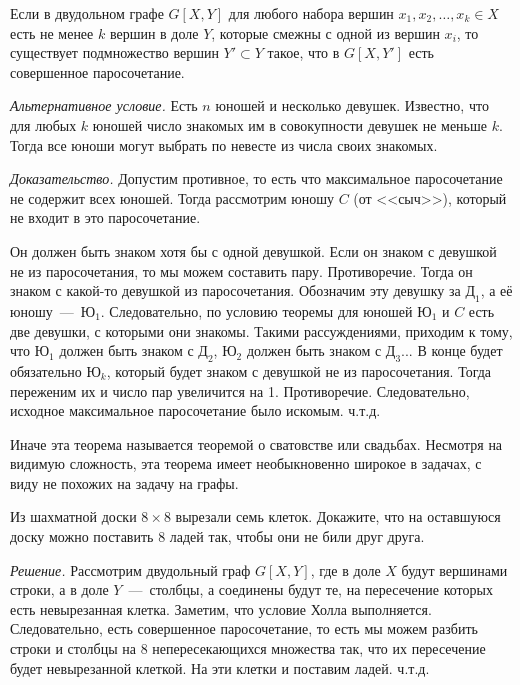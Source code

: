 \begin{theorem}[Холла]
	Если в двудольном графе $G[X, Y]$ для любого набора вершин $x_1, x_2, \dots, x_k \in X$ есть не менее $k$ вершин в доле $Y$, которые смежны с одной из вершин $x_i$, то существует подмножество вершин $Y' \subset Y$ такое, что в $G[X, Y']$ есть совершенное паросочетание.
	
	\emph{Альтернативное условие.} Есть $n$ юношей и несколько девушек. Известно, что для любых $k$ юношей число знакомых им в совокупности девушек не меньше $k$. Тогда все юноши могут выбрать по невесте из числа своих знакомых.
	
	\emph{Доказательство.} Допустим противное, то есть что максимальное паросочетание не содержит всех юношей. Тогда рассмотрим юношу $C$ (от <<сыч>>), который не входит в это паросочетание.
	
	Он должен быть знаком хотя бы с одной девушкой. Если он знаком с девушкой не из паросочетания, то мы можем составить пару. Противоречие. Тогда он знаком с какой-то девушкой из паросочетания. Обозначим эту девушку за $Д_1$, а её юношу~---~$Ю_1$. Следовательно, по условию теоремы для юношей $Ю_1$ и $C$ есть две девушки, с которыми они знакомы. Такими рассуждениями, приходим к тому, что $Ю_1$ должен быть знаком с $Д_2$, $Ю_2$ должен быть знаком с $Д_3$... В конце будет обязательно $Ю_k$, который будет знаком с девушкой не из паросочетания. Тогда переженим их и число пар увеличится на 1. Противоречие. Следовательно, исходное максимальное паросочетание было искомым. ч.т.д. 
\end{theorem}

	Иначе эта теорема называется теоремой о сватовстве или свадьбах. Несмотря на видимую сложность, эта теорема имеет необыкновенно широкое в задачах, с виду не похожих на задачу на графы.
	
\begin{example}
	Из шахматной доски $8 \times 8$ вырезали семь клеток. Докажите, что на оставшуюся доску можно поставить $8$ ладей так, чтобы они не били друг друга.
	
	\emph{Решение.} Рассмотрим двудольный граф $G[X, Y]$, где в доле $X$ будут вершинами строки, а в доле $Y$~---~столбцы, а соединены будут те, на пересечение которых есть невырезанная клетка. Заметим, что условие Холла выполняется. Следовательно, есть совершенное паросочетание, то есть мы можем разбить строки и столбцы на $8$ непересекающихся множества так, что их пересечение будет невырезанной клеткой. На эти клетки и поставим ладей. ч.т.д.
\end{example}

